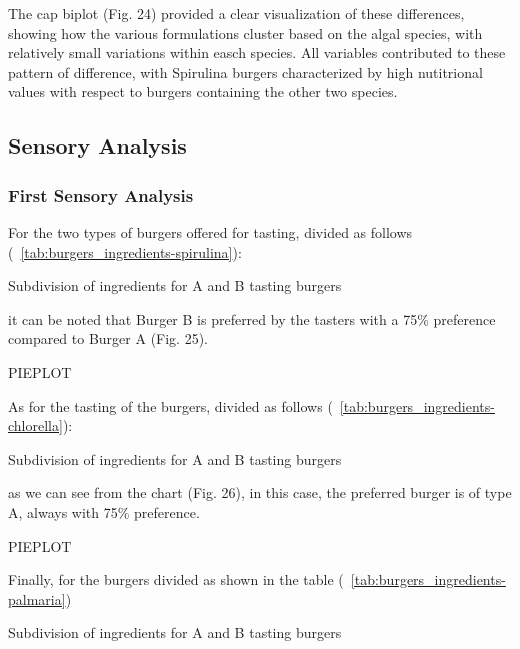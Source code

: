The \gls{cap} biplot (Fig. 24) provided a clear visualization of these differences, showing how the various formulations cluster based on the algal species, with relatively small variations within easch species. All variables contributed to these pattern of difference, with Spirulina burgers characterized by high nutitrional values with respect to burgers containing the other two species.

\subsection{Sensory Analysis}
\subsubsection{First Sensory Analysis}
For the two types of  burgers offered for tasting, divided as follows (\tab{}~\ref{tab:burgers_ingredients-spirulina}):
\begin{table}[H]
	\caption{Subdivision of ingredients for  A and B tasting burgers}
	\label{tab:burgers_ingredients-spirulina}
	\centering
	
\end{table}

it can be noted that Burger B is preferred by the tasters with a 75\% preference compared to Burger A (Fig. 25).

PIEPLOT

As for the tasting of the  burgers, divided as follows (\tab{}~\ref{tab:burgers_ingredients-chlorella}):
\begin{table}[H]
	\caption{Subdivision of ingredients for  A and B tasting burgers}
	\label{tab:burgers_ingredients-chlorella}
	\centering
	
\end{table}

as we can see from the chart (Fig. 26), in this case, the preferred burger is of type A, always with 75\% preference.

PIEPLOT

Finally, for the  burgers divided as shown in the table (\tab{}~\ref{tab:burgers_ingredients-palmaria})
\begin{table}[H]
	\caption{Subdivision of ingredients for  A and B tasting burgers}
	\label{tab:burgers_ingredients-palmaria}
	\centering
	
\end{table}

